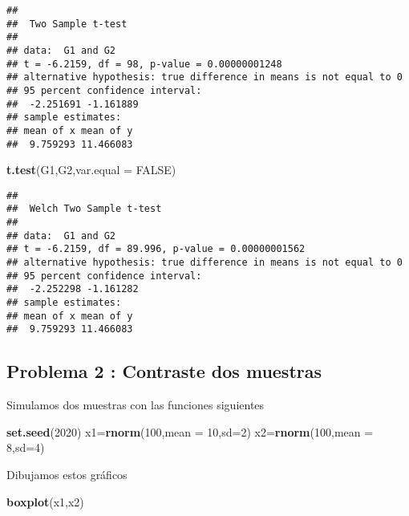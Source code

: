 \documentclass[
]{article}
\newenvironment{Shaded}{\begin{snugshade}}{\end{snugshade}}
\newcommand{\DataTypeTok}[1]{\textcolor[rgb]{0.13,0.29,0.53}{#1}}
\newcommand{\DecValTok}[1]{\textcolor[rgb]{0.00,0.00,0.81}{#1}}
\newcommand{\KeywordTok}[1]{\textcolor[rgb]{0.13,0.29,0.53}{\textbf{#1}}}
\newcommand{\NormalTok}[1]{#1}
\newcommand{\OtherTok}[1]{\textcolor[rgb]{0.56,0.35,0.01}{#1}}
\begin{document}
\begin{verbatim}
## 
##  Two Sample t-test
## 
## data:  G1 and G2
## t = -6.2159, df = 98, p-value = 0.00000001248
## alternative hypothesis: true difference in means is not equal to 0
## 95 percent confidence interval:
##  -2.251691 -1.161889
## sample estimates:
## mean of x mean of y 
##  9.759293 11.466083
\end{verbatim}

\begin{Shaded}
\begin{Highlighting}[]
\KeywordTok{t.test}\NormalTok{(G1,G2,}\DataTypeTok{var.equal =} \OtherTok{FALSE}\NormalTok{)}
\end{Highlighting}
\end{Shaded}

\begin{verbatim}
## 
##  Welch Two Sample t-test
## 
## data:  G1 and G2
## t = -6.2159, df = 89.996, p-value = 0.00000001562
## alternative hypothesis: true difference in means is not equal to 0
## 95 percent confidence interval:
##  -2.252298 -1.161282
## sample estimates:
## mean of x mean of y 
##  9.759293 11.466083
\end{verbatim}

\hypertarget{problema-2-contraste-dos-muestras}{%
\subsection{Problema 2 : Contraste dos
muestras}\label{problema-2-contraste-dos-muestras}}

Simulamos dos muestras con las funciones siguientes

\begin{Shaded}
\begin{Highlighting}[]
\KeywordTok{set.seed}\NormalTok{(}\DecValTok{2020}\NormalTok{)}
\NormalTok{x1=}\KeywordTok{rnorm}\NormalTok{(}\DecValTok{100}\NormalTok{,}\DataTypeTok{mean =} \DecValTok{10}\NormalTok{,}\DataTypeTok{sd=}\DecValTok{2}\NormalTok{)}
\NormalTok{x2=}\KeywordTok{rnorm}\NormalTok{(}\DecValTok{100}\NormalTok{,}\DataTypeTok{mean =} \DecValTok{8}\NormalTok{,}\DataTypeTok{sd=}\DecValTok{4}\NormalTok{)}
\end{Highlighting}
\end{Shaded}

Dibujamos estos gráficos

\begin{Shaded}
\begin{Highlighting}[]
\KeywordTok{boxplot}\NormalTok{(x1,x2)}
\end{Highlighting}
\end{Shaded}
\end{document}
